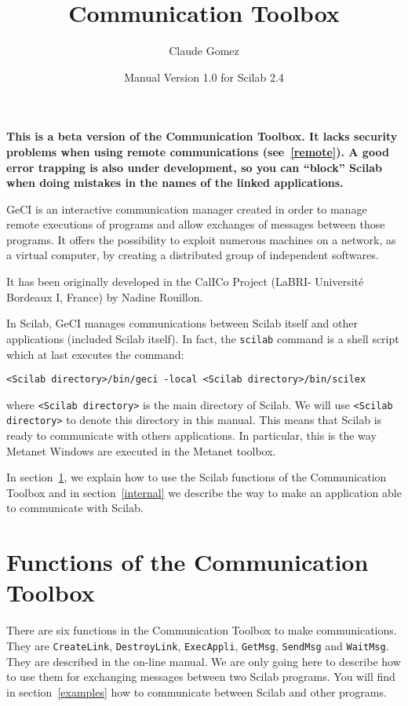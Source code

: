 \documentclass[11pt]{article}
\title{Communication Toolbox}
\author{Claude Gomez}
\date{Manual Version 1.0 for Scilab 2.4}
\newcommand{\func}[1]{\texttt{#1}}
\newcommand{\T}[1]{\texttt{#1}}
\begin{document}
\maketitle

\small\textbf{
This is a beta version of the Communication Toolbox. It lacks security
problems when using remote communications (see~\ref{remote}). A good
error trapping is also under development, so you can ``block'' Scilab
when doing mistakes in the names of the linked applications.
}

\bigskip

GeCI is an interactive communication manager created in order to
manage remote executions of programs and allow exchanges of messages
between those programs. It offers the possibility to exploit numerous
machines on a network, as a virtual computer, by creating a
distributed group of independent softwares.

It has been originally developed in the CalICo Project (LaBRI-
Universit\'e Bordeaux I, France) by Nadine Rouillon.

In Scilab, GeCI manages communications between Scilab itself and other
applications (included Scilab itself). In fact, the \T{scilab}
command is a shell script which at last executes the command:

\begin{verbatim}
<Scilab directory>/bin/geci -local <Scilab directory>/bin/scilex
\end{verbatim}

where \verb|<Scilab directory>| is the main directory of Scilab.
We will use  \verb|<Scilab directory>| to denote this directory in
this manual.
This means that Scilab is ready to communicate with others
applications. In particular, this is the way Metanet Windows are
executed in the Metanet toolbox.

In section~\ref{functions}, we explain how to use the Scilab functions of the
Communication Toolbox and in section~\ref{internal} we describe the
way to make an application able to communicate with Scilab.

\section{Functions of the Communication Toolbox}\label{functions}

There are six functions in the Communication Toolbox to make
communications. They are 
\func{CreateLink}, \func{DestroyLink}, \func{ExecAppli},
\func{GetMsg}, \func{SendMsg} and \func{WaitMsg}. They are described
in the on-line manual. We are only going here to describe how to use
them for exchanging messages between two Scilab programs. You will find
in section~\ref{examples} how to communicate between Scilab and other
programs.
\end{document}
